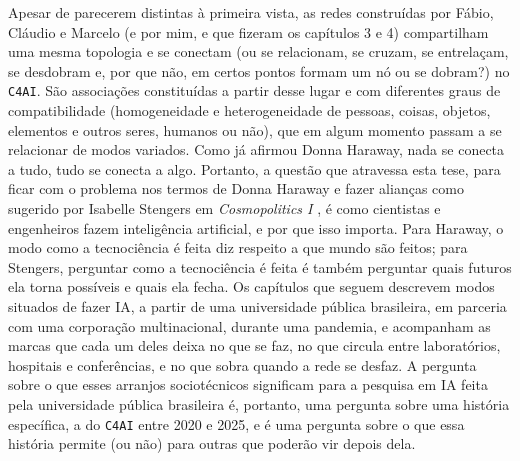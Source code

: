 Apesar de parecerem distintas à primeira vista, as redes construídas por Fábio, Cláudio e Marcelo (e por mim, e que fizeram os capítulos 3 e 4) compartilham uma mesma topologia e se conectam (ou se relacionam, se cruzam, se entrelaçam, se desdobram e, por que não, em certos pontos formam um nó ou se dobram?) no \texttt{C4AI}. São associações constituídas a partir desse lugar e com diferentes graus de compatibilidade (homogeneidade e heterogeneidade de pessoas, coisas, objetos, elementos e outros seres, humanos ou não), que em algum momento passam a se relacionar de modos variados. Como já afirmou Donna Haraway, nada se conecta a tudo, tudo se conecta a algo. Portanto, a questão que atravessa esta tese, para ficar com o problema nos termos de Donna Haraway \parencite{Haraway2016Staying} e fazer alianças como sugerido por Isabelle Stengers em \textit{Cosmopolitics I} \parencite{stengers2010cosmopolitics1}, é como cientistas e engenheiros fazem inteligência artificial, e por que isso importa. Para Haraway, o modo como a tecnociência é feita diz respeito a que mundo são feitos; para Stengers, perguntar como a tecnociência é feita é também perguntar quais futuros ela torna possíveis e quais ela fecha. Os capítulos que seguem descrevem modos situados de fazer IA, a partir de uma universidade pública brasileira, em parceria com uma corporação multinacional, durante uma pandemia, e acompanham as marcas que cada um deles deixa no que se faz, no que circula entre laboratórios, hospitais e conferências, e no que sobra quando a rede se desfaz. A pergunta sobre o que esses arranjos sociotécnicos significam para a pesquisa em IA feita pela universidade pública brasileira é, portanto, uma pergunta sobre uma história específica, a do \texttt{C4AI} entre 2020 e 2025, e é uma pergunta sobre o que essa história permite (ou não) para outras que poderão vir depois dela.

